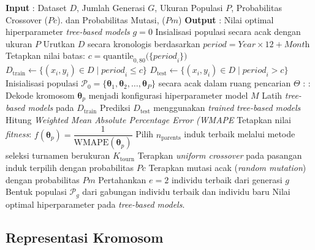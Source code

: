     \begin{algorithm}[H]
    \caption{Tahapan Algoritma Genetika \protect\cite{https://doi.org/10.1155/2023/9673395}}
    \label{alg:ga}
    \begin{algorithmic}[1]
    \State \textbf{Input} : Dataset $D$, Jumlah Generasi $G$, Ukuran Populasi $P$, Probabilitas Crossover ($Pc$). dan Probabilitas Mutasi, ($Pm$)
    \State \textbf{Output} : Nilai optimal hiperparameter \textit{tree-based models}
    \State $g = 0$
    \State Insialisasi populasi secara acak dengan ukuran $P$
    \State Urutkan $D$ secara kronologis berdasarkan $\textit{period} = \textit{Year} \times 12 + \textit{Month}$
    \State Tetapkan nilai batas: $c = \text{quantile}_{0{,}80}\bigl(\{\textit{period}_i\}\bigr)$
    \State $D_{\text{train}} \gets \{(x_i, y_i) \in D \mid \textit{period}_i \leq c\}$
    \State $D_{\text{test}}  \gets \{(x_i, y_i) \in D \mid \textit{period}_i > c\}$
    \State Inisialisasi populasi $\mathcal{P}_0 = \{\boldsymbol{\theta}_1, \boldsymbol{\theta}_2, \ldots, \boldsymbol{\theta}_P\}$ secara acak dalam ruang pencarian $\Theta$
    :
      :
        \State Dekode kromosom $\boldsymbol{\theta}_p$ menjadi konfigurasi hiperparameter model $M$
        \State Latih \textit{tree-based models} pada $D_{\text{train}}$
        \State Prediksi $D_{\text{test}}$ menggunakan \textit{trained} \textit{tree-based models}
        \State Hitung \textit{Weighted Mean Absolute Percentage Error (WMAPE}
        \State Tetapkan nilai \textit{fitness}: $f(\boldsymbol{\theta}_p) = \dfrac{1}{\mathrm{WMAPE}(\boldsymbol{\theta}_p)}$
      \EndFor
      \State Pilih $n_{\text{parents}}$ induk terbaik melalui metode seleksi turnamen berukuran $K_{\text{tourn}}$
      \State Terapkan \textit{uniform crossover} pada pasangan induk terpilih dengan probabilitas $Pc$
      \State Terapkan mutasi acak (\textit{random mutation}) dengan probabilitas $Pm$
      \State Pertahankan $e = 2$ individu terbaik dari generasi $g$
      \State Bentuk populasi $\mathcal{P}_g$ dari gabungan individu terbaik dan individu baru
    \EndWhile
    \State \Return Nilai optimal hiperparameter pada \textit{tree-based models}.
    \end{algorithmic}
    \end{algorithm}

    \subsection{Representasi Kromosom}

